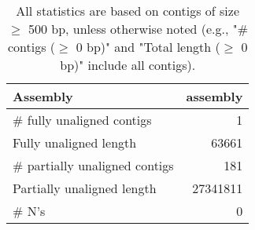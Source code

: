 \documentclass[12pt,a4paper]{article}
\begin{document}
\begin{table}[ht]
\begin{center}
\caption{All statistics are based on contigs of size $\geq$ 500 bp, unless otherwise noted (e.g., "\# contigs ($\geq$ 0 bp)" and "Total length ($\geq$ 0 bp)" include all contigs).}
\begin{tabular}{|l*{1}{|r}|}
\hline
Assembly & assembly \\ \hline
\# fully unaligned contigs & 1 \\ \hline
Fully unaligned length & 63661 \\ \hline
\# partially unaligned contigs & 181 \\ \hline
Partially unaligned length & 27341811 \\ \hline
\# N's & 0 \\ \hline
\end{tabular}
\end{center}
\end{table}
\end{document}
